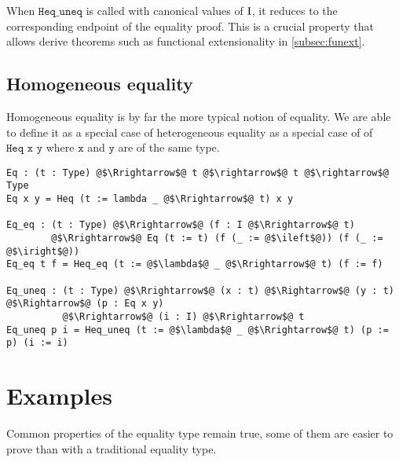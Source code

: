 \documentclass[12pt,twoside,maitrise]{dms}
\theoremstyle{definition}
\numberwithin{equation}{section}
\numberwithin{table}{chapter}
\numberwithin{figure}{chapter}
\newcommand\fn[1] {\texttt{#1}}
\begin{document}
When $\fn{Heq\_uneq}$ is called with canonical values of $\mathrm{I}$, it reduces to
the corresponding endpoint of the equality proof. This is a crucial property
that allows derive theorems such as functional extensionality in
\autoref{subsec:funext}.

\subsection{Homogeneous equality}
Homogeneous equality is by far the more typical notion of equality. We are able
to define it as a special case of heterogeneous equality as a special case of of
$\fn{Heq x y}$ where $\fn{x}$ and $\fn{y}$ are of the same type.

\begin{verbatim}
Eq : (t : Type) @$\Rrightarrow$@ t @$\rightarrow$@ t @$\rightarrow$@ Type
Eq x y = Heq (t := lambda _ @$\Rrightarrow$@ t) x y

Eq_eq : (t : Type) @$\Rrightarrow$@ (f : I @$\Rrightarrow$@ t)
        @$\Rrightarrow$@ Eq (t := t) (f (_ := @$\ileft$@)) (f (_ := @$\iright$@))
Eq_eq t f = Heq_eq (t := @$\lambda$@ _ @$\Rrightarrow$@ t) (f := f)

Eq_uneq : (t : Type) @$\Rrightarrow$@ (x : t) @$\Rightarrow$@ (y : t) @$\Rightarrow$@ (p : Eq x y)
          @$\Rrightarrow$@ (i : I) @$\Rrightarrow$@ t
Eq_uneq p i = Heq_uneq (t := @$\lambda$@ _ @$\Rrightarrow$@ t) (p := p) (i := i)
\end{verbatim}

\section{Examples}\label{sec:eq-examples}
Common properties of the equality type remain true, some of them are easier to prove than with a traditional equality type.
\end{document}
